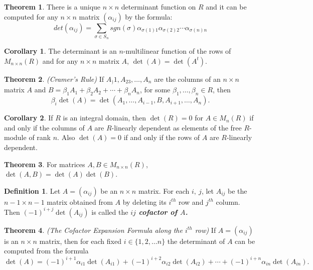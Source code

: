 \documentclass[10pt]{article}
\theoremstyle{definition}
\newtheorem{thm}{Theorem}[section]
\newtheorem*{cor}{Corollary}
\newtheorem*{defn}{Definition}
\newcommand{\nl}{\vspace{7em}}
\newcommand{\al}{\alpha}
\newcommand{\be}{\beta}
\begin{document}
\nl

\begin{thm}
There is a unique $n\times n$ determinant function on $R$ and it can be computed for any $n\times n$ matrix $(\al_{ij})$ by the formula:
\[det(\al_{ij}) = \sum_{\sigma\in S_n} sgn(\sigma) \al_{\sigma(1)1} \al_{\sigma(2)2} \cdots \al_{\sigma(n)n}\]
\end{thm}

\nl

\begin{cor}
The determinant is an $n$-multilinear function of the rows of $M_{n\times n}(R)$ and for any $n\times n $ matrix $A$, $\det(A) = \det(A^t)$.
\end{cor}

\nl

\begin{thm}\textit{(Cramer's Rule)}
If $A_)1,A_23,\ldots, A_n$ are the columns of an $n\times n$ matrix $A$ and $B = \be_1A_1 + \be_2A_2 + \cdots + \be_nA_n$, for some $\be_1,\ldots, \be_n\in R$, then
\[\be_i\det(A) = \det(A_1,\ldots,A_{i-1}, B, A_{i+1},\ldots, A_n).\]
\end{thm}

\nl

\begin{cor}
If $R$ is an integral domain, then $\det(R) = 0$ for $A\in M_n(R)$ if and only if the columns of $A$ are $R$-linearly dependent as elements of the free $R$-module of rank $n$. Also $\det(A) = 0$ if and only if the rows of $A$ are $R$-linearly dependent.
\end{cor}

\nl

\begin{thm}
For matrices $A, B\in M_{n\times n}(R)$, $\det(A,B) = \det(A)\det(B)$.
\end{thm}

\nl

\begin{defn}
Let $A = (\al_{ij})$ be an $n\times n$ matrix. For each $i,\ j$, let $A_{ij}$ be the $n-1\times n-1$ matrix obtained from $A$ by deleting its $i^{th}$ row and $j^{th}$ column. Then $(-1)^{i + j}\det(A_{ij})$ is called the \textit{\textbf{$ij$ cofactor of $A$.}}
\end{defn}

\nl

\begin{thm}\textit{(The Cofactor Expansion Formula along the $i^{th}$ row)}
If $A = (\al_{ij})$ is an $n\times n$ matrix, then for each fixed $i\in \{1,2,\ldots n\}$ the determinant of $A$ can be computed from the formula
\[\det(A) = (-1)^{i+1}\al_{i1}\det(A_{i1}) + (-1)^{i+2}\al_{i2}\det(A_{i2}) + \cdots + (-1)^{i+n}\al_{in}\det(A_{in}).\]
\end{thm}
\end{document}
